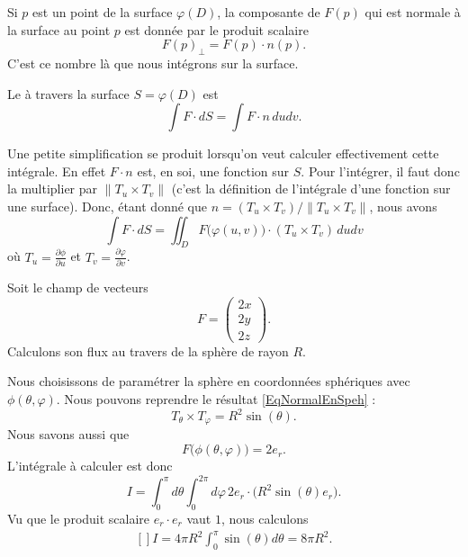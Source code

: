 Si \( p\) est un point de la surface \( \varphi(D)\), la composante de \( F(p)\) qui est normale à la surface au point \( p\) est donnée par le produit scalaire
\begin{equation}
	F(p)_{\perp}=F(p)\cdot n(p).
\end{equation}
C'est ce nombre là que nous intégrons sur la surface.

\begin{definition}
	Le  à travers la surface \( S=\varphi(D)\) est
	\begin{equation}
		\int F\cdot dS=\int F \cdot n\,dudv.
	\end{equation}
\end{definition}

Une petite simplification se produit lorsqu'on veut calculer effectivement cette intégrale. En effet \( F\cdot n\) est, en soi, une fonction sur \( S\). Pour l'intégrer, il faut donc la multiplier par \( \| T_u\times T_v \|\) (c'est la définition de l'intégrale d'une fonction sur une surface). Donc, étant donné que \( n=(T_u\times T_v)/\| T_u\times T_v \|\), nous avons
\begin{equation}
	\int F\cdot dS=\iint_D F\big( \varphi(u,v) \big)\cdot (T_u\times T_v)\,dudv
\end{equation}
où \( T_u=\frac{ \partial \phi }{ \partial u }\) et \( T_v=\frac{ \partial \varphi }{ \partial v }\).


\begin{example}
	Soit le champ de vecteurs
	\begin{equation}
		F=\begin{pmatrix}
			2x \\
			2y \\
			2z
		\end{pmatrix}.
	\end{equation}
	Calculons son flux au travers de la sphère de rayon \( R\).

	Nous choisissons de paramétrer la sphère en coordonnées sphériques avec \( \phi(\theta,\varphi)\). Nous pouvons reprendre le résultat \eqref{EqNormalEnSpeh} :
	\begin{equation}
		T_{\theta}\times T_{\varphi}=R^2\sin(\theta).
	\end{equation}
	Nous savons aussi que
	\begin{equation}
		F\big( \phi(\theta,\varphi) \big)=2e_r.
	\end{equation}
	L'intégrale à calculer est donc
	\begin{equation}
		I=\int_0^{\pi}d\theta\int_0^{2\pi}d\varphi\, 2e_r\cdot\big( R^2\sin(\theta)e_r \big).
	\end{equation}
	Vu que le produit scalaire \( e_r\cdot e_r\) vaut \( 1\), nous calculons
	\begin{equation}
		\begin{aligned}[]
			I=4\pi R^2\int_0^{\pi}\sin(\theta)d\theta=8\pi R^2.
		\end{aligned}
	\end{equation}

\end{example}


